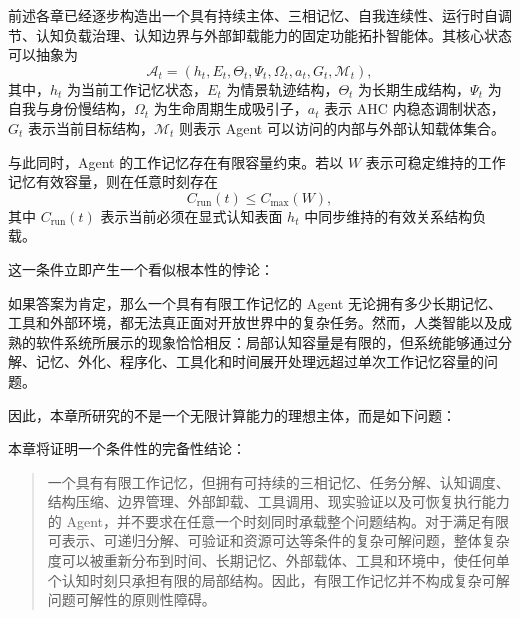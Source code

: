 前述各章已经逐步构造出一个具有持续主体、三相记忆、自我连续性、运行时自调节、认知负载治理、认知边界与外部卸载能力的固定功能拓扑智能体。其核心状态可以抽象为
\begin{equation}
\mathcal A_t
=
\left(
h_t,
E_t,
\Theta_t,
\Psi_t,
\Omega_t,
a_t,
G_t,
\mathcal M_t
\right),
\end{equation}
其中，$h_t$ 为当前工作记忆状态，$E_t$ 为情景轨迹结构，$\Theta_t$ 为长期生成结构，$\Psi_t$ 为自我与身份慢结构，$\Omega_t$ 为生命周期生成吸引子，$a_t$ 表示 AHC 内稳态调制状态，$G_t$ 表示当前目标结构，$\mathcal M_t$ 则表示 Agent 可以访问的内部与外部认知载体集合。

与此同时，Agent 的工作记忆存在有限容量约束。若以 $W$ 表示可稳定维持的工作记忆有效容量，则在任意时刻存在
\begin{equation}
C_{\mathrm{run}}(t)
\leq
C_{\max}(W),
\label{eq:wm-capacity}
\end{equation}
其中 $C_{\mathrm{run}}(t)$ 表示当前必须在显式认知表面 $h_t$ 中同步维持的有效关系结构负载。

这一条件立即产生一个看似根本性的悖论：

\begin{statementbox}
\centering
{}
\end{statementbox}

如果答案为肯定，那么一个具有有限工作记忆的 Agent 无论拥有多少长期记忆、工具和外部环境，都无法真正面对开放世界中的复杂任务。然而，人类智能以及成熟的软件系统所展示的现象恰恰相反：局部认知容量是有限的，但系统能够通过分解、记忆、外化、程序化、工具化和时间展开处理远超过单次工作记忆容量的问题。

因此，本章所研究的不是一个无限计算能力的理想主体，而是如下问题：

\begin{statementbox}
\centering
{}
\end{statementbox}

本章将证明一个条件性的完备性结论：

\begin{quote}
一个具有有限工作记忆，但拥有可持续的三相记忆、任务分解、认知调度、结构压缩、边界管理、外部卸载、工具调用、现实验证以及可恢复执行能力的 Agent，并不要求在任意一个时刻同时承载整个问题结构。对于满足有限可表示、可递归分解、可验证和资源可达等条件的复杂可解问题，整体复杂度可以被重新分布到时间、长期记忆、外部载体、工具和环境中，使任何单个认知时刻只承担有限的局部结构。因此，有限工作记忆并不构成复杂可解问题可解性的原则性障碍。
\end{quote}

